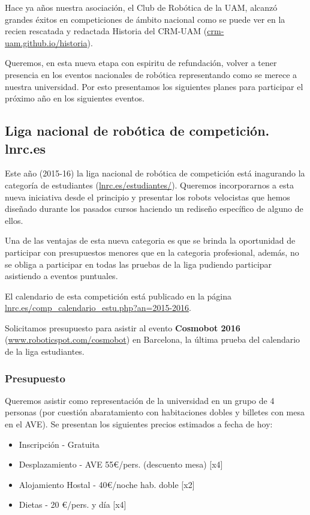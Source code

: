 \documentclass[12pt,twoside]{report}
\begin{document}
Hace ya años nuestra asociación, el Club de Robótica de la UAM, alcanzó grandes éxitos en competiciones de ámbito nacional como se puede ver en la recien rescatada y redactada Historia del CRM-UAM (\url{crm-uam.github.io/historia}).

Queremos, en esta nueva etapa con espiritu de refundación, volver a tener presencia en los eventos nacionales de robótica representando como se merece a nuestra universidad. Por esto presentamos los siguientes planes para participar el próximo año en los siguientes eventos.

\subsection{Liga nacional de robótica de competición. lnrc.es}
Este año (2015-16) la liga nacional de robótica de competición está inagurando la categoría de estudiantes (\url{lnrc.es/estudiantes/}). Queremos incorporarnos a esta nueva iniciativa desde el principio y presentar los robots velocistas que hemos diseñado durante los pasados cursos haciendo un rediseño específico de alguno de ellos.

Una de las ventajas de esta nueva categoria es que se brinda la oportunidad de participar con presupuestos menores que en la categoria profesional, además, no se obliga a participar en todas las pruebas de la liga pudiendo participar asistiendo a eventos puntuales.

El calendario de esta competición está publicado en la página \url{lnrc.es/comp_calendario_estu.php?an=2015-2016}.

Solicitamos presupuesto para asistir al evento {\bf Cosmobot 2016} (\url{www.roboticspot.com/cosmobot}) en Barcelona, la última prueba del calendario de la liga estudiantes.

\subsubsection{Presupuesto}
Queremos asistir como representación de la universidad en un grupo de 4 personas (por cuestión abaratamiento con habitaciones dobles y billetes con mesa en el AVE). Se presentan los siguientes precios estimados a fecha de hoy:
\begin{itemize}
\item Inscripción - Gratuita
\item Desplazamiento - AVE 55\euro{}/pers. (descuento mesa) [x4]
\item Alojamiento Hostal - 40\euro{}/noche hab. doble [x2]
\item Dietas - 20 \euro{}/pers. y día [x4]
\end{itemize}
\end{document}
